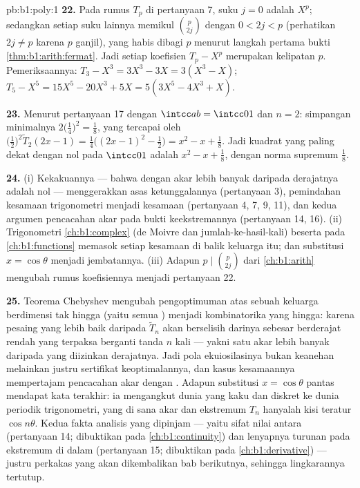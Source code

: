 \begin{solution}{pb:b1:poly:1}
\textbf{22.} Pada rumus $T_p$ di pertanyaan 7, suku $j = 0$
adalah $X^p$; sedangkan setiap suku lainnya memikul $\binom p{2j}$ dengan $0 < 2j <
p$ (perhatikan $2j \neq p$ karena $p$ ganjil), yang habis dibagi $p$
menurut langkah pertama bukti \cref{thm:b1:arith:fermat}.
Jadi setiap koefisien $T_p - X^p$ merupakan kelipatan $p$.
Pemeriksaannya: $T_3 - X^3 = 3X^3 - 3X = 3(X^3 - X)$; $T_5 - X^5 = 15X^5
- 20X^3 + 5X = 5(3X^5 - 4X^3 + X)$.

\textbf{23.} Menurut pertanyaan 17 dengan $\intcc ab = \intcc01$ dan $n =
2$: simpangan minimalnya $2\bigl(\frac14\bigr)^2 = \frac18$,
yang tercapai oleh $\bigl(\frac12\bigr)^2\widetilde T_2(2x - 1) =
\frac14\bigl((2x-1)^2 - \frac12\bigr) = x^2 - x + \frac18$. Jadi
kuadrat  yang paling dekat dengan nol pada $\intcc01$ adalah $x^2 - x +
\frac18$, dengan norma supremum $\frac18$.

\textbf{24.} (i) Kekakuannya --- bahwa  dengan akar lebih banyak daripada
derajatnya adalah nol --- menggerakkan asas ketunggalannya
(pertanyaan 3), pemindahan kesamaan trigonometri menjadi
kesamaan  (pertanyaan 4, 7, 9, 11), dan kedua
argumen pencacahan akar pada bukti keekstremannya (pertanyaan 14,
16). (ii) Trigonometri \cref{ch:b1:complex} (de Moivre dan
jumlah-ke-hasil-kali) beserta  pada
\cref{ch:b1:functions} memasok setiap kesamaan di balik keluarga itu;
dan substitusi $x = \cos\theta$ menjadi jembatannya. (iii) Adapun
 $p \mid \binom p{2j}$ dari \cref{ch:b1:arith} mengubah
rumus koefisiennya menjadi  pertanyaan 22.

\textbf{25.} Teorema Chebyshev mengubah pengoptimuman atas sebuah
keluarga berdimensi tak hingga (yaitu semua ) menjadi
kombinatorika yang hingga: karena pesaing yang lebih baik daripada $\widetilde T_n$ akan
berselisih darinya sebesar  berderajat rendah yang terpaksa berganti tanda
$n$ kali --- yakni satu akar lebih banyak daripada yang diizinkan derajatnya. Jadi pola
ekuiosilasinya bukan keanehan melainkan justru
sertifikat keoptimalannya, dan kasus kesamaannya mempertajam
pencacahan akar dengan . Adapun substitusi $x =
\cos\theta$ pantas mendapat kata terakhir: ia mengangkut dunia 
yang kaku dan diskret ke dunia periodik
trigonometri, yang di sana akar dan ekstremum $T_n$ hanyalah
kisi teratur $\cos n\theta$. Kedua fakta analisis yang dipinjam
--- yaitu sifat nilai antara (pertanyaan 14; dibuktikan pada
\cref{ch:b1:continuity}) dan lenyapnya turunan pada
ekstremum di dalam (pertanyaan 15; dibuktikan pada \cref{ch:b1:derivative})
--- justru perkakas yang akan dikembalikan bab berikutnya,
sehingga lingkarannya tertutup.

\end{solution}
